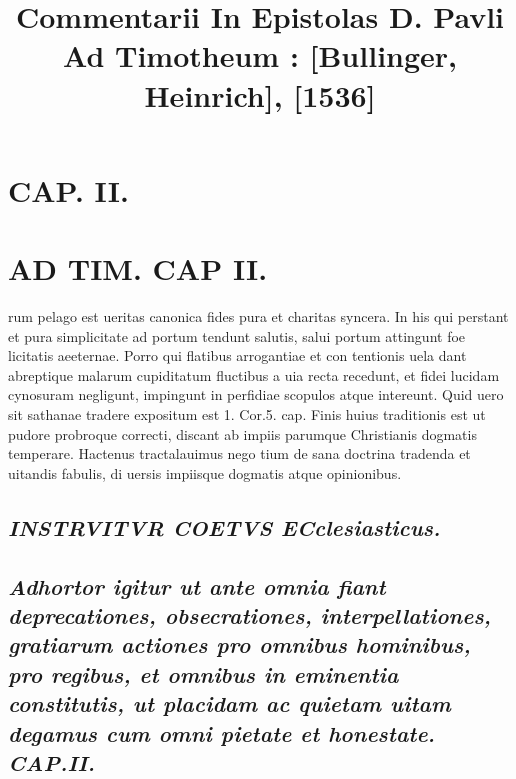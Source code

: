 \documentclass{article}
\begin{document}
\date{}
        \title{Commentarii In Epistolas D. Pavli Ad Timotheum : [Bullinger, Heinrich], [1536]}
\maketitle
\tableofcontents
\clearpage
\begin{pages} 
\beginnumbering
\section{CAP. II.}
\section*{AD TIM. CAP II. }
\marginpar{[ p.107 ]}\pstart rum pelago est ueritas canonica fides pura et charitas syncera. In his qui perstant et pura simplicitate ad portum tendunt salutis, salui portum attingunt foe licitatis aeeternae. Porro qui flatibus arrogantiae et con tentionis uela dant abreptique malarum cupiditatum fluctibus a uia recta recedunt, et fidei lucidam cynosuram negligunt, impingunt in perfidiae scopulos atque intereunt. Quid uero sit sathanae tradere expositum est 1. Cor.5. cap. Finis huius traditionis est ut pudore probroque correcti, discant ab impiis parumque Christianis dogmatis temperare. Hactenus tractalauimus nego tium de sana doctrina tradenda et uitandis fabulis, di uersis impiisque dogmatis atque opinionibus.  \pend 
{}
{}
\subsection*{\textit{INSTRVITVR COETVS ECclesiasticus. }} 
{}
\subsection*{\textit{Adhortor igitur ut ante omnia fiant deprecationes, obsecrationes, interpellationes, gratiarum actiones pro omnibus hominibus, pro regibus, et omnibus in eminentia constitutis, ut placidam ac quietam uitam degamus cum omni pietate et honestate. CAP.II. }}

\end{pages}
\end{document}
